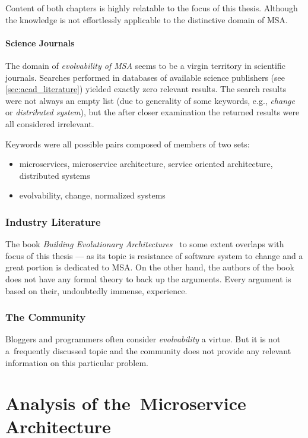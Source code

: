 \documentclass[thesis=M,english,hidelinks]{FITthesis}[2012/10/20]
\begin{document}
Content of both chapters is highly relatable to the focus of this thesis. Although the knowledge is not effortlessly applicable to the distinctive domain of \acrlong{MSA}.

\subsubsection*{Science Journals}
The domain of \textit{evolvability of \acrlong{MSA}} seems to be a virgin territory in scientific journals. Searches performed in databases of available science publishers (see \ref{sec:acad_literature}) yielded exactly zero relevant results. The search results were not always an empty list (due to generality of some keywords, e.g., \textit{change} or \textit{distributed system}), but the after closer examination the returned results were all considered irrelevant.

Keywords were all possible pairs composed of members of two sets:
\begin{itemize}
    \item microservices, microservice architecture, service oriented architecture, distributed systems
    \item evolvability, change, normalized systems
\end{itemize}

\subsection{Industry Literature}
The book \textit{Building Evolutionary Architectures}~\cite{ms-evolutionary-arch} to some extent overlaps with focus of this thesis --- as its topic is resistance of software system to change and a great portion is dedicated to \acrlong{MSA}. On the other hand, the authors of the book does not have any formal theory to back up the arguments. Every argument is based on their, undoubtedly immense, experience. 

\subsection{The Community}
Bloggers and programmers often consider \textit{evolvability} a virtue. But it is not a~frequently discussed topic and the community does not provide any relevant information on this particular problem.

% 
% 
\chapter{Analysis of the~Microservice Architecture}
\label{sec:msa_analysis}
\end{document}
